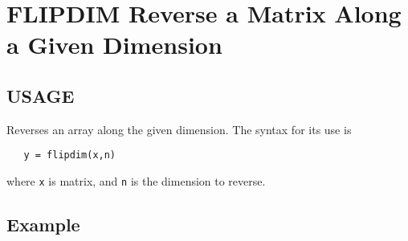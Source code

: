 \section{FLIPDIM Reverse a Matrix Along a Given Dimension}

\subsection{USAGE}

Reverses an array along the given dimension.  The syntax for its use is
\begin{verbatim}
   y = flipdim(x,n)
\end{verbatim}
where \verb|x| is matrix, and \verb|n| is the dimension to reverse.
\subsection{Example}

